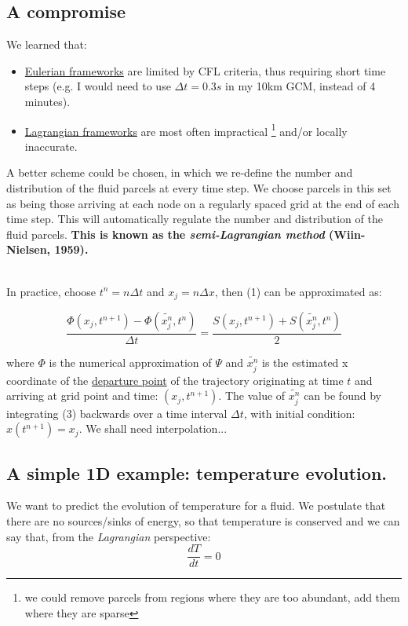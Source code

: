 \subsection{A compromise}

We learned that:
\begin{itemize}
	\item \underline{Eulerian frameworks} are limited by CFL criteria, thus requiring short time steps (e.g. I would need to use $\Delta t = 0.3s$ in my 10km GCM, instead of 4 minutes).
	\item \underline{Lagrangian frameworks} are most often impractical \footnote{\tiny we could remove parcels from regions where they are too abundant, add them where they are sparse} and/or locally inaccurate.
\end{itemize}

A better scheme could be chosen, in which we re-define the number and distribution of the fluid parcels at every time step. We choose parcels in this set as being those arriving at each node on a regularly spaced grid at the end of each time step. This will automatically regulate the number and distribution of the fluid parcels. \textbf{This is known as the \emph{semi-Lagrangian method} (Wiin-Nielsen, 1959).}\\

~

In practice, choose $t^n=n\Delta t$ and $x_j=n\Delta x$, then (1) can be approximated as:
 
 \begin{equation}
 \frac {\Phi(x_j,t^{n+1}) - \Phi (\tilde{x_j^n},t^{n})}{\Delta t}=\frac{S(x_j,t^{n+1}) + S (\tilde{x_j^n},t^{n})}{2}
 \label{SL}	
 \end{equation}

where $\Phi$ is the numerical approximation of $\Psi$ and $\tilde{x_j^n}$ is the estimated x coordinate of the \underline{departure point} of the trajectory originating at time $t$ and arriving at grid point and time: $(x_j,t^{n+1})$. The value of $\tilde{x_j^n}$ can be found by integrating (3) backwards over a time interval $\Delta t$, with initial condition: $x(t^{n+1})= x_j$. We shall need interpolation...


\subsection{A simple 1D example: temperature evolution.}

We want to predict the evolution of temperature for a fluid. We postulate that there are no sources/sinks of energy, so that temperature is conserved and we can say that, from the \emph{Lagrangian} perspective:
\begin{equation}
\frac{d T } {d t} = 0
\label{eq_Lagr}
\end{equation}

